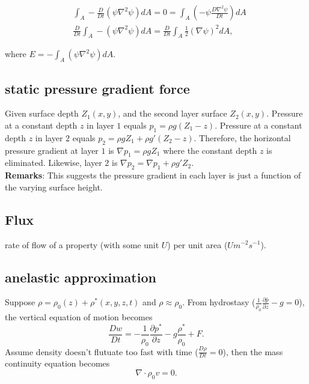 \begin{equation} \begin{aligned} & \int_A -\frac{D}{Dt} (\psi \nabla^2\psi) dA= 0= \int_A \left(
-\psi \frac{D\nabla^2\psi}{Dt} \right) dA \\ & \frac{D}{Dt} \int_A -(\psi \nabla^2\psi) dA=
\frac{D}{Dt} \int_A \frac{1}{2} (\nabla\psi)^2 dA, \end{aligned} \end{equation}

where $E= -\int_A (\psi \nabla^2\psi) dA$.



\subsection{static pressure gradient force} Given surface depth $Z_1(x,y)$, and the second layer
surface $Z_2(x,y)$.  Pressure at a constant depth $z$ in layer $1$ equals $p_1= \rho g (Z_1- z)$.
Pressure at a constant depth $z$ in layer $2$ equals $p_2= \rho g Z_1 + \rho g' (Z_2- z)$.
Therefore, the horizontal pressure gradient at layer $1$ is $\nabla p_1= \rho g Z_1$ where the
constant depth $z$ is eliminated. Likewise, layer $2$ is $\nabla p_2= \nabla p_1 + \rho g' Z_2$. \\

{\bf Remarks}: This suggests the pressure gradient in each layer is just a function of the varying
surface height.


\subsection{Flux} \begin{defn*} rate of flow of a property (with some unit $U$) per unit area
($U m^{-2}s^{-1}$). \end{defn*}

\subsection{anelastic approximation} \begin{defn*} Suppose $\rho = \rho_0(z) + \rho^*(x,y,z,t)$
and $\rho \approx \rho_0$. From hydrostasy ($\frac{1}{\rho_0}\frac{\partial \bar{p}}{\partial z} - g
= 0$), the vertical equation of motion becomes \begin{equation} \frac{Dw}{Dt} = - \frac{1}{\rho_0}
\frac{\partial p^*}{\partial z} - g\frac{\rho^*}{\rho_0} + F.  \end{equation} Assume density doesn't
flutuate too fast with time ($\frac{D\rho}{Dt}=0$), then the mass continuity equation becomes
\begin{equation} \nabla \cdot \rho_0 v = 0.  \end{equation} \end{defn*}

